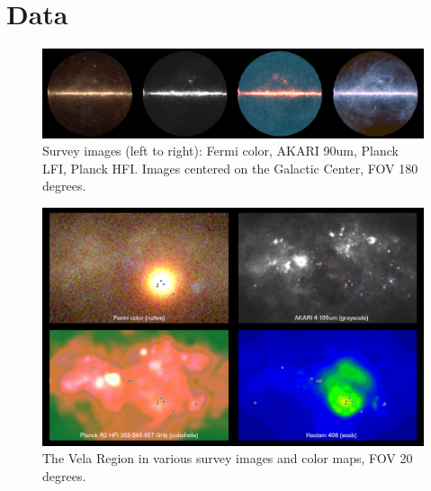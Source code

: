 \renewcommand{\thefootnote}{\arabic{footnote}}

\section{Data}

\begin{figure}[tb]
  \centerline{\includegraphics[width=\textwidth]{figures/four_images}}
  \caption{Survey images (left to right): Fermi color, AKARI 90um, Planck LFI, Planck HFI. Images centered on the Galactic Center, FOV 180 degrees.}
  \label{fig:four_images}
\end{figure}

\begin{figure}[tb]
  \centerline{\includegraphics[width=\textwidth]{figures/vela_region}}
  \caption{The Vela Region in various survey images and color maps, FOV 20 degrees.}
  \label{fig:vela_region}
\end{figure}



